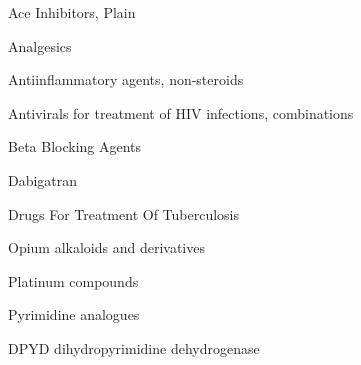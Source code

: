\documentclass{resume} %
\begin{document}
\begin{rSection}{ Ace Inhibitors, Plain }
\item[]
\begin{rSection}{ Analgesics }
\item[]
\begin{rSection}{ Antiinflammatory agents, non-steroids }
\item[]
\begin{rSection}{ Antivirals for treatment of HIV infections, combinations }
\item[]
\begin{rSection}{ Beta Blocking Agents }
\item[]
\begin{rSection}{ Dabigatran }
\item[]
\begin{rSection}{ Drugs For Treatment Of Tuberculosis }
\item[]
\begin{rSection}{ Opium alkaloids and derivatives }
\item[]
\begin{rSection}{ Platinum compounds }
\item[]
\begin{rSection}{ Pyrimidine analogues }
\item[]
\begin{rSubsection}{ DPYD }{ dihydropyrimidine dehydrogenase }{}{}
\item[]


\end{rSubsection}
\end{rSection}
\end{rSection}
\end{rSection}
\end{rSection}
\end{rSection}
\end{rSection}
\end{rSection}
\end{rSection}
\end{rSection}
\end{rSection}
\end{document}
